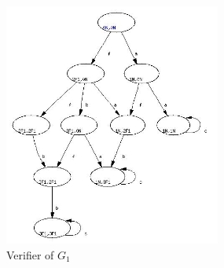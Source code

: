 \documentclass[a4paper, 10pt, conference]{ieeeconf}
\begin{document}
% 
% 

\begin{figure}[t]
\centering
 	\includegraphics[height=80mm]{verifier_G1.jpg}
\caption{Verifier of $G_1$}
\label{fig:verifier_G1}
\end{figure}
\end{document}
